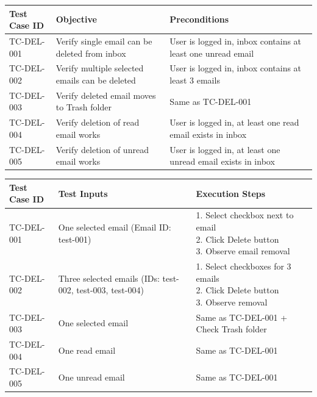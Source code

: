 \documentclass[12pt,a4paper]{article}
\begin{document}
\begin{table}[h!]
\centering
\begin{tabular}{|p{3cm}|p{5cm}|p{7cm}|}
\hline
\textbf{Test Case ID} & \textbf{Objective} & \textbf{Preconditions} \\
\hline
TC-DEL-001 & Verify single email can be deleted from inbox & User is logged in, inbox contains at least one unread email \\
\hline
TC-DEL-002 & Verify multiple selected emails can be deleted & User is logged in, inbox contains at least 3 emails \\
\hline
TC-DEL-003 & Verify deleted email moves to Trash folder & Same as TC-DEL-001 \\
\hline
TC-DEL-004 & Verify deletion of read email works & User is logged in, at least one read email exists in inbox \\
\hline
TC-DEL-005 & Verify deletion of unread email works & User is logged in, at least one unread email exists in inbox \\
\hline
\end{tabular}
\end{table}

\begin{table}[h!]
\centering
\begin{tabular}{|p{3cm}|p{5cm}|p{7cm}|}
\hline
\textbf{Test Case ID} & \textbf{Test Inputs} & \textbf{Execution Steps} \\
\hline
TC-DEL-001 & One selected email (Email ID: test-001) & \parbox{5cm}{1. Select checkbox next to email\\2. Click Delete button\\3. Observe email removal} \\
\hline
TC-DEL-002 & Three selected emails (IDs: test-002, test-003, test-004) & \parbox{5cm}{1. Select checkboxes for 3 emails\\2. Click Delete button\\3. Observe removal} \\
\hline
TC-DEL-003 & One selected email & Same as TC-DEL-001 + Check Trash folder \\
\hline
TC-DEL-004 & One read email & Same as TC-DEL-001 \\
\hline
TC-DEL-005 & One unread email & Same as TC-DEL-001 \\
\hline
\end{tabular}
\end{table}
\end{document}
